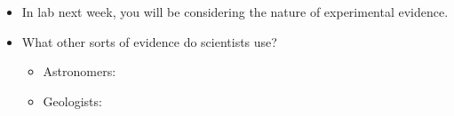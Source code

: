 \begin{frame}
    \begin{itemize}
        \item<1-> In lab next week, you will be considering the nature of
            experimental evidence.
        \item<2-> What other sorts of evidence do scientists use? 
        \begin{itemize}
            \item Astronomers:
            \item Geologists:
        \end{itemize}
    \end{itemize}
\end{frame}


